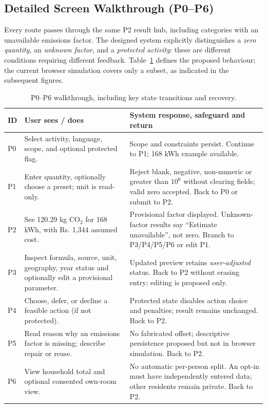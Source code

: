 \documentclass[12pt,a4paper]{article}
\begin{document}
\subsection{Detailed Screen Walkthrough (P0--P6)}
Every route passes through the same P2 result hub, including categories with an unavailable emissions factor. The designed system explicitly distinguishes a \emph{zero quantity}, an \emph{unknown factor}, and a \emph{protected activity}: these are different conditions requiring different feedback. Table~\ref{tab:walkthrough} defines the proposed behaviour; the current browser simulation covers only a subset, as indicated in the subsequent figures.

\begin{table}[H]
\centering\footnotesize
\caption{P0--P6 walkthrough, including key state transitions and recovery.}
\label{tab:walkthrough}
\begin{tabularx}{\textwidth}{@{}p{0.8cm}p{4.1cm}X@{}}
\toprule
\textbf{ID}&\textbf{User sees / does}&\textbf{System response, safeguard and return}\\
\midrule
P0&Select activity, language, scope, and optional protected flag.&Scope and constraints persist. Continue to P1; 168 kWh example available.\\
P1&Enter quantity, optionally choose a preset; unit is read-only.&Reject blank, negative, non-numeric or greater than $10^6$ without clearing fields; valid zero accepted. Back to P0 or submit to P2.\\
P2&See 120.29 kg CO$_2$ for 168 kWh, with Rs. 1,344 assumed cost.&Provisional factor displayed. Unknown-factor results say ``Estimate unavailable'', not zero. Branch to P3/P4/P5/P6 or edit P1.\\
P3&Inspect formula, source, unit, geography, year status and optionally edit a provisional parameter.&Updated preview retains \emph{user-adjusted} status. Back to P2 without erasing entry; editing is proposed only.\\
P4&Choose, defer, or decline a feasible action (if not protected).&Protected state disables action choice and penalties; result remains unchanged. Back to P2.\\
P5&Read reason why an emissions factor is missing; describe repair or reuse.&No fabricated offset; descriptive persistence proposed but not in browser simulation. Back to P2.\\
P6&View household total and optional consented own-room view.&No automatic per-person split. An opt-in must have independently entered data; other residents remain private. Back to P2.\\
\bottomrule
\end{tabularx}
\end{table}
\end{document}
